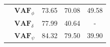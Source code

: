 \begin{table}[]
\begin{tabular}{llcccccc}
                                                   & $\mathbf{VAF}_\phi$                                    & \multicolumn{2}{c}{73.65}                                                                          & \multicolumn{2}{c}{70.08}                                                                          & \multicolumn{2}{c}{49.58}                                                                          \\
                                                   & $\mathbf{VAF}_\delta$                                  & \multicolumn{2}{c}{77.99}                                                                          & \multicolumn{2}{c}{40.64}                                                                          & \multicolumn{2}{c}{-}                                                                              \\
                                                   & $\mathbf{VAF}_\psi$                                    & \multicolumn{2}{c}{84.32}                                                                          & \multicolumn{2}{c}{79.50}                                                                          & \multicolumn{2}{c}{39.90}                                                                         
    \end{tabular}
    \end{table}
